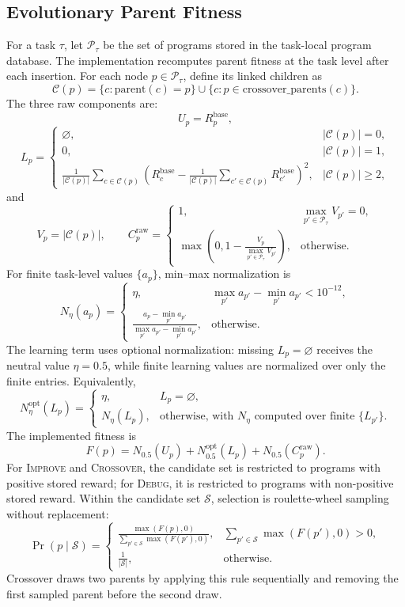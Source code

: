 \subsection{Evolutionary Parent Fitness}
\label{app:evolutionary-fitness}

For a task $\tau$, let $\mathcal{P}_{\tau}$ be the set of programs stored in the task-local program database.
The implementation recomputes parent fitness at the task level after each insertion.
For each node $p\in\mathcal{P}_{\tau}$, define its linked children as
\[
\mathcal{C}(p)=\{c:\mathrm{parent}(c)=p\}\cup\{c:p\in \mathrm{crossover\_parents}(c)\}.
\]
The three raw components are:
\[
U_p = R^{\mathrm{base}}_p,
\]
\[
L_p =
\begin{cases}
\varnothing, & |\mathcal{C}(p)|=0,\\
0, & |\mathcal{C}(p)|=1,\\
\frac{1}{|\mathcal{C}(p)|}\sum_{c\in\mathcal{C}(p)}
\left(R^{\mathrm{base}}_c-\frac{1}{|\mathcal{C}(p)|}\sum_{c'\in\mathcal{C}(p)}R^{\mathrm{base}}_{c'}\right)^2,
& |\mathcal{C}(p)|\ge 2,
\end{cases}
\]
and
\[
V_p=|\mathcal{C}(p)|,\qquad
C^{\mathrm{raw}}_p =
\begin{cases}
1, & \max_{p'\in\mathcal{P}_{\tau}} V_{p'}=0,\\
\max\!\left(0,1-\frac{V_p}{\max_{p'\in\mathcal{P}_{\tau}}V_{p'}}\right), & \text{otherwise}.
\end{cases}
\]
For finite task-level values $\{a_p\}$, min--max normalization is
\[
N_{\eta}(a_p)=
\begin{cases}
\eta, & \max_{p'}a_{p'}-\min_{p'}a_{p'} < 10^{-12},\\
\frac{a_p-\min_{p'}a_{p'}}{\max_{p'}a_{p'}-\min_{p'}a_{p'}}, & \text{otherwise}.
\end{cases}
\]
The learning term uses optional normalization: missing $L_p=\varnothing$ receives the neutral value $\eta=0.5$, while finite learning values are normalized over only the finite entries.
Equivalently,
\[
N_{\eta}^{\mathrm{opt}}(L_p)=
\begin{cases}
\eta, & L_p=\varnothing,\\
N_{\eta}(L_p), & \text{otherwise, with } N_{\eta} \text{ computed over finite } \{L_{p'}\}.
\end{cases}
\]
The implemented fitness is
\[
F(p)=N_{0.5}(U_p)+N_{0.5}^{\mathrm{opt}}(L_p)+N_{0.5}(C^{\mathrm{raw}}_p).
\]
For \textsc{Improve} and \textsc{Crossover}, the candidate set is restricted to programs with positive stored reward; for \textsc{Debug}, it is restricted to programs with non-positive stored reward.
Within the candidate set $\mathcal{S}$, selection is roulette-wheel sampling without replacement:
\[
\Pr(p\mid \mathcal{S})=
\begin{cases}
\frac{\max(F(p),0)}{\sum_{p'\in\mathcal{S}}\max(F(p'),0)}, & \sum_{p'\in\mathcal{S}}\max(F(p'),0)>0,\\
\frac{1}{|\mathcal{S}|}, & \text{otherwise}.
\end{cases}
\]
Crossover draws two parents by applying this rule sequentially and removing the first sampled parent before the second draw.


